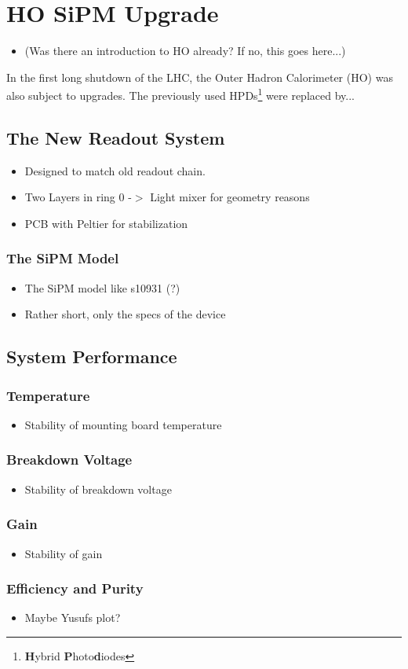 \section{HO SiPM Upgrade}
\begin{itemize}
\item(Was there an introduction to HO already? If no, this goes here...)
\end{itemize}
In the first long shutdown of the LHC, the Outer Hadron Calorimeter (HO) was also subject to upgrades. The previously used HPDs\footnote{{\bf H}ybrid {\bf P}hoto{\bf d}iodes} were replaced by...
\subsection{The New Readout System}
\begin{itemize}
\item Designed to match old readout chain.
\item Two Layers in ring 0 -$>$ Light mixer for geometry reasons
\item PCB with Peltier for stabilization
\end{itemize}
\subsubsection{The SiPM Model}
\begin{itemize}
\item The SiPM model like s10931 (?)
\item Rather short, only the specs of the device
\end{itemize}
\subsection{System Performance}
\subsubsection{Temperature}
\begin{itemize}
\item Stability of mounting board temperature
\end{itemize}
\subsubsection{Breakdown Voltage}
\begin{itemize}
\item Stability of breakdown voltage 
\end{itemize}
\subsubsection{Gain}
\begin{itemize}
\item Stability of gain
\end{itemize}
\subsubsection{Efficiency and Purity}
\begin{itemize}
\item Maybe Yusufs plot?
\end{itemize}

